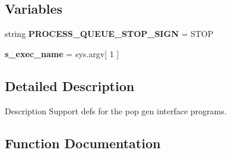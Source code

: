 \subsection*{Variables}
\begin{DoxyCompactItemize}
\item 
string {\bfseries P\+R\+O\+C\+E\+S\+S\+\_\+\+Q\+U\+E\+U\+E\+\_\+\+S\+T\+O\+P\+\_\+\+S\+I\+GN} = \textquotesingle{}S\+T\+OP\textquotesingle{}\hypertarget{namespacenegui_1_1pgutilities_aed436e1fc2eb29963ea30b17e614fd04}{}\label{namespacenegui_1_1pgutilities_aed436e1fc2eb29963ea30b17e614fd04}

\item 
{\bfseries s\+\_\+exec\+\_\+name} = sys.\+argv\mbox{[} 1 \mbox{]}\hypertarget{namespacenegui_1_1pgutilities_a25b185def2c6bb2698b1927b4a20a904}{}\label{namespacenegui_1_1pgutilities_a25b185def2c6bb2698b1927b4a20a904}

\end{DoxyCompactItemize}


\subsection{Detailed Description}
\begin{DoxyVerb}Description
Support defs for the pop gen interface programs.
\end{DoxyVerb}
 

\subsection{Function Documentation}
